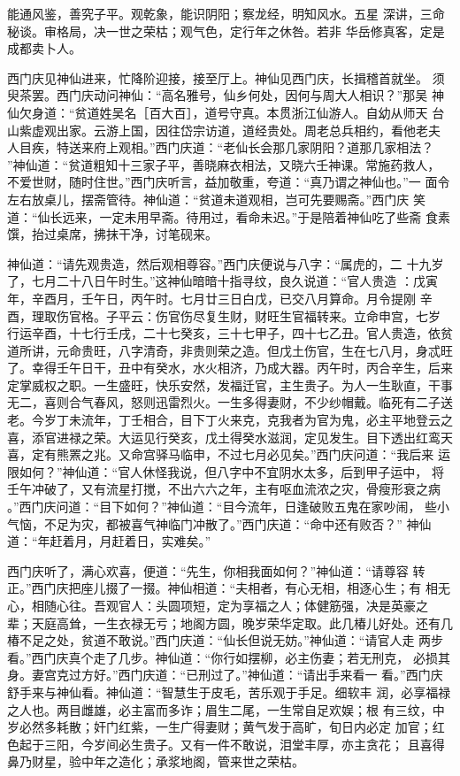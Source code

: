 能通风鉴，善究子平。观乾象，能识阴阳；察龙经，明知风水。五星
深讲，三命秘谈。审格局，决一世之荣枯；观气色，定行年之休咎。若非
华岳修真客，定是成都卖卜人。

西门庆见神仙进来，忙降阶迎接，接至厅上。神仙见西门庆，长揖稽首就坐。
须臾茶罢。西门庆动问神仙：“高名雅号，仙乡何处，因何与周大人相识？”那吴
神仙欠身道：“贫道姓吴名［百大百］，道号守真。本贯浙江仙游人。自幼从师天
台山紫虚观出家。云游上国，因往岱宗访道，道经贵处。周老总兵相约，看他老夫
人目疾，特送来府上观相。”西门庆道：“老仙长会那几家阴阳？道那几家相法？
”神仙道：“贫道粗知十三家子平，善晓麻衣相法，又晓六壬神课。常施药救人，
不爱世财，随时住世。”西门庆听言，益加敬重，夸道：“真乃谓之神仙也。”一
面令左右放桌儿，摆斋管待。神仙道：“贫道未道观相，岂可先要赐斋。”西门庆
笑道：“仙长远来，一定未用早斋。待用过，看命未迟。”于是陪着神仙吃了些斋
食素馔，抬过桌席，拂抹干净，讨笔砚来。

神仙道：“请先观贵造，然后观相尊容。”西门庆便说与八字：“属虎的，二
十九岁了，七月二十八日午时生。”这神仙暗暗十指寻纹，良久说道：“官人贵造
：戊寅年，辛酉月，壬午日，丙午时。七月廿三日白戊，已交八月算命。月令提刚
辛酉，理取伤官格。子平云：伤官伤尽复生财，财旺生官福转来。立命申宫，七岁
行运辛酉，十七行壬戌，二十七癸亥，三十七甲子，四十七乙丑。官人贵造，依贫
道所讲，元命贵旺，八字清奇，非贵则荣之造。但戊土伤官，生在七八月，身忒旺
了。幸得壬午日干，丑中有癸水，水火相济，乃成大器。丙午时，丙合辛生，后来
定掌威权之职。一生盛旺，快乐安然，发福迁官，主生贵子。为人一生耿直，干事
无二，喜则合气春风，怒则迅雷烈火。一生多得妻财，不少纱帽戴。临死有二子送
老。今岁丁未流年，丁壬相合，目下丁火来克，克我者为官为鬼，必主平地登云之
喜，添官进禄之荣。大运见行癸亥，戊土得癸水滋润，定见发生。目下透出红鸾天
喜，定有熊罴之兆。又命宫驿马临申，不过七月必见矣。”西门庆问道：“我后来
运限如何？”神仙道：“官人休怪我说，但八字中不宜阴水太多，后到甲子运中，
将壬午冲破了，又有流星打搅，不出六六之年，主有呕血流浓之灾，骨瘦形衰之病
。”西门庆问道：“目下如何？”神仙道：“目今流年，日逢破败五鬼在家吵闹，
些小气恼，不足为灾，都被喜气神临门冲散了。”西门庆道：“命中还有败否？”
神仙道：“年赶着月，月赶着日，实难矣。”

西门庆听了，满心欢喜，便道：“先生，你相我面如何？”神仙道：“请尊容
转正。”西门庆把座儿掇了一掇。神仙相道：“夫相者，有心无相，相逐心生；有
相无心，相随心往。吾观官人：头圆项短，定为享福之人；体健筋强，决是英豪之
辈；天庭高耸，一生衣禄无亏；地阁方圆，晚岁荣华定取。此几椿儿好处。还有几
椿不足之处，贫道不敢说。”西门庆道：“仙长但说无妨。”神仙道：“请官人走
两步看。”西门庆真个走了几步。神仙道：“你行如摆柳，必主伤妻；若无刑克，
必损其身。妻宫克过方好。”西门庆道：“已刑过了。”神仙道：“请出手来看一
看。”西门庆舒手来与神仙看。神仙道：“智慧生于皮毛，苦乐观于手足。细软丰
润，必享福禄之人也。两目雌雄，必主富而多诈；眉生二尾，一生常自足欢娱；根
有三纹，中岁必然多耗散；奸门红紫，一生广得妻财；黄气发于高旷，旬日内必定
加官；红色起于三阳，今岁间必生贵子。又有一件不敢说，泪堂丰厚，亦主贪花；
且喜得鼻乃财星，验中年之造化；承浆地阁，管来世之荣枯。

